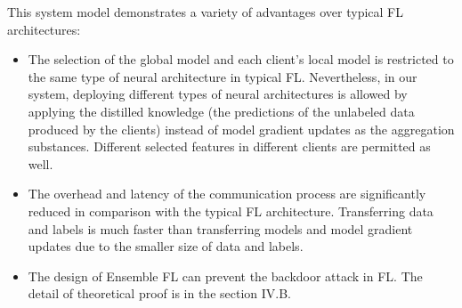 \documentclass[journal]{IEEEtran}
\begin{document}
\par This system model demonstrates a variety of advantages over typical FL architectures:
\begin{itemize}

  \item The selection of the global model and each client's local model is restricted to the same type of neural architecture in typical FL. Nevertheless, in our system, deploying different types of neural architectures is allowed by applying the distilled knowledge (the predictions of the unlabeled data produced by the clients) instead of model gradient updates as the aggregation substances. Different selected features in different clients are permitted as well.
  \item The overhead and latency of the communication process are significantly reduced in comparison with the typical FL architecture. Transferring data and labels is much faster than transferring models and model gradient updates due to the smaller size of data and labels. 
  \item The design of Ensemble FL can prevent the backdoor attack in FL. The detail of theoretical proof is in the section IV.B.
\end{itemize}
      
\end{document}
